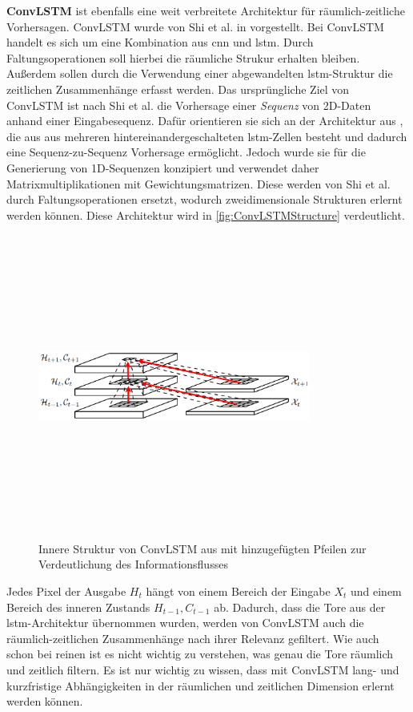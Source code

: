 \textbf{ConvLSTM} ist ebenfalls eine weit verbreitete Architektur für räumlich-zeitliche Vorhersagen.
Conv\-LSTM wurde von Shi et al. in \cite{ConvLSTM} vorgestellt.
Bei ConvLSTM handelt es sich um eine Kombination aus \acrshort{cnn} und \acrshort{lstm}.
Durch Faltungsoperationen soll hierbei die räumliche Strukur erhalten bleiben.
Außerdem sollen durch die Verwendung einer abgewandelten \acrshort{lstm}-Struktur die zeitlichen Zusammenhänge erfasst werden.
Das ursprüngliche Ziel von ConvLSTM ist nach Shi et al. die Vorhersage einer \emph{Sequenz} von 2D-Daten anhand einer Eingabesequenz.
Dafür orientieren sie sich an der Architektur aus \cite{SequenceGeneratingLSTM}, die aus aus mehreren hintereinandergeschalteten \acrshort{lstm}-Zellen besteht und dadurch eine Sequenz-zu-Sequenz Vorhersage ermöglicht.
Jedoch wurde sie für die Generierung von 1D-Sequenzen konzipiert und verwendet daher Matrixmultiplikationen mit Gewichtungsmatrizen.
Diese werden von Shi et al. durch Faltungsoperationen ersetzt, wodurch zweidimensionale Strukturen erlernt werden können.
Diese Architektur wird in \autoref{fig:ConvLSTMStructure} verdeutlicht.

\begin{figure}[h]
    \centering
    \includegraphics[width=0.8\textwidth,height=10cm,keepaspectratio=true]{content/images/ConvLSTMStructure.png}
    \caption{Innere Struktur von ConvLSTM aus \cite{ConvLSTM} mit hinzugefügten Pfeilen zur Verdeutlichung des Informationsflusses}
    \label{fig:ConvLSTMStructure}
\end{figure}

Jedes Pixel der Ausgabe $H_t$ hängt von einem Bereich der Eingabe $X_t$ und einem Bereich des inneren Zustands $H_{t-1}, C_{t-1}$ ab.
Dadurch, dass die Tore aus der \acrshort{lstm}-Architektur übernommen wurden, werden von ConvLSTM auch die räumlich-zeitlichen Zusammenhänge nach ihrer Relevanz gefiltert.
Wie auch schon bei reinen  ist es nicht wichtig zu verstehen, was genau die Tore räumlich und zeitlich filtern.
Es ist nur wichtig zu wissen, dass mit ConvLSTM lang- und kurzfristige Abhängigkeiten in der räumlichen und zeitlichen Dimension erlernt werden können.

